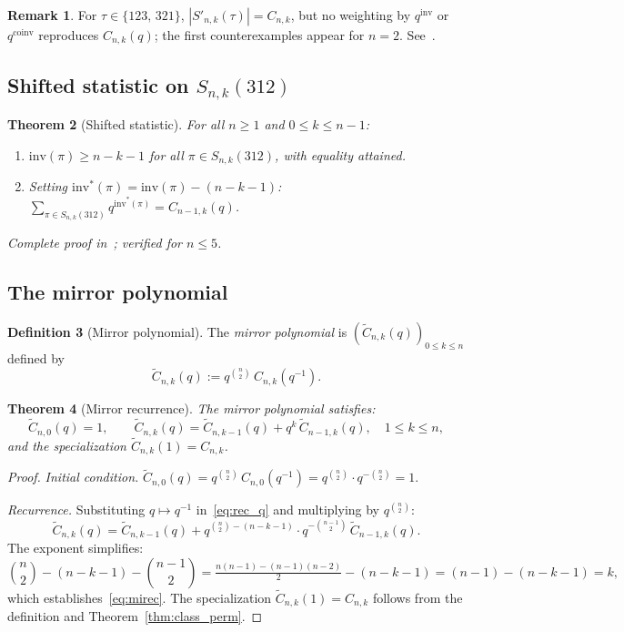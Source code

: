 \documentclass[12pt,a4paper,reqno]{amsart}
\theoremstyle{plain}
\newtheorem{theorem}{Theorem}[section]
\theoremstyle{definition}
\newtheorem{definition}[theorem]{Definition}
\newtheorem{remark}[theorem]{Remark}
\newcommand{\Inv}{\mathrm{inv}}
\newcommand{\Coinv}{\mathrm{coinv}}
\newcommand{\invstar}{\mathrm{inv}^{*}}
\newcommand{\Snk}[1]{S_{n,k}(#1)}
\newcommand{\Snkp}[1]{S'_{n,k}(#1)}
\newcommand{\Ctilde}{\widetilde{C}}
\begin{document}
\begin{remark}\label{rem:123_321}
For $\tau\in\{123,\,321\}$, $|\Snkp{\tau}|=C_{n,k}$, but no
weighting by $q^{\Inv}$ or $q^{\Coinv}$ reproduces $C_{n,k}(q)$;
the first counterexamples appear for $n=2$. See~\cite{W3}.
\end{remark}

\subsection{Shifted statistic on $S_{n,k}(312)$}
\begin{theorem}[Shifted statistic]\label{thm:invstar}
For all $n\ge1$ and $0\le k\le n-1$:
\begin{enumerate}
\item[\rm(i)] $\Inv(\pi)\ge n-k-1$ for all $\pi\in\Snk{312}$, with equality attained.
\item[\rm(ii)] Setting $\invstar(\pi)=\Inv(\pi)-(n-k-1)$:
$\sum_{\pi\in\Snk{312}} q^{\invstar(\pi)} = C_{n-1,k}(q)$.
\end{enumerate}
Complete proof in~\cite{W2}; verified for $n\le 5$.
\end{theorem}

\subsection{The mirror polynomial}
\begin{definition}[Mirror polynomial]\label{def:miroir}
The \emph{mirror polynomial} is $(\Ctilde_{n,k}(q))_{0\le k\le n}$ defined by
\begin{equation}\label{eq:miroir_def}
\Ctilde_{n,k}(q) := q^{\binom{n}{2}}\,C_{n,k}(q^{-1}).
\end{equation}
\end{definition}

\begin{theorem}[Mirror recurrence]\label{thm:miroir}
The mirror polynomial satisfies:
\begin{equation}\label{eq:mirec}
\Ctilde_{n,0}(q)=1,\qquad
\Ctilde_{n,k}(q) = \Ctilde_{n,k-1}(q)+q^{k}\,\Ctilde_{n-1,k}(q),
\quad 1\le k\le n,
\end{equation}
and the specialization $\Ctilde_{n,k}(1)=C_{n,k}$.
\end{theorem}
\begin{proof}
\textit{Initial condition.}
$\Ctilde_{n,0}(q)=q^{\binom{n}{2}}\,C_{n,0}(q^{-1})
=q^{\binom{n}{2}}\cdot q^{-\binom{n}{2}}=1$.

\textit{Recurrence.}
Substituting $q\mapsto q^{-1}$ in~\eqref{eq:rec_q}
and multiplying by $q^{\binom{n}{2}}$:
\[\Ctilde_{n,k}(q)= \Ctilde_{n,k-1}(q)
+q^{\binom{n}{2}-(n-k-1)}\cdot q^{-\binom{n-1}{2}}\,\Ctilde_{n-1,k}(q).\]
The exponent simplifies:
\[\binom{n}{2}-(n-k-1)-\binom{n-1}{2}
=\tfrac{n(n-1)-(n-1)(n-2)}{2}-(n-k-1)=(n-1)-(n-k-1)=k,\]
which establishes~\eqref{eq:mirec}.
The specialization $\Ctilde_{n,k}(1)=C_{n,k}$ follows from the definition
and Theorem~\ref{thm:class_perm}.
\end{proof}
\end{document}
